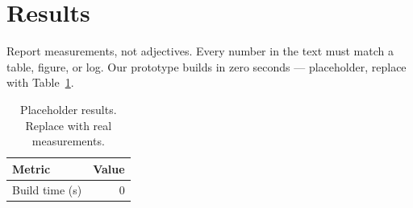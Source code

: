 \section{Results}\label{sec:results}

Report measurements, not adjectives.
Every number in the text must match a table, figure, or log.
Our prototype builds in zero seconds — placeholder, replace with Table~\ref{tab:main}.
\begin{table}[t]
    \caption{Placeholder results. Replace with real measurements.}\label{tab:main}
    \begin{tabular}{lr}
        \toprule
        Metric         & Value \\
        \midrule
        Build time (s) & 0     \\
        \bottomrule
    \end{tabular}
\end{table}
